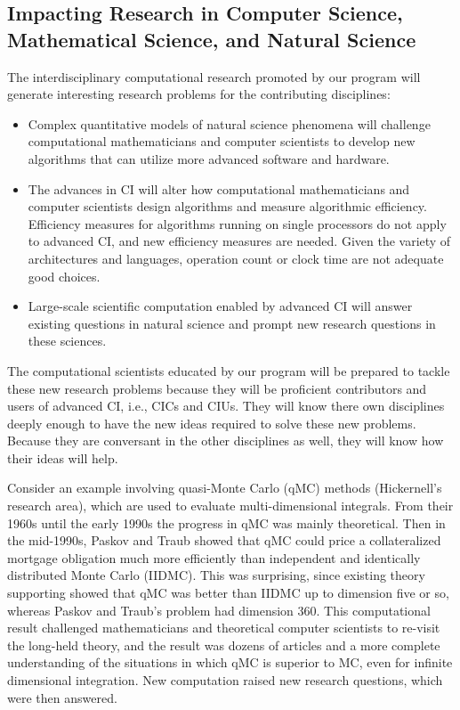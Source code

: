 \documentclass[11pt]{NSFamsart}
\begin{document}
\subsection{Impacting Research in Computer Science, Mathematical Science, and Natural Science}
The interdisciplinary computational research promoted by our program will generate interesting research problems for the contributing disciplines:
\begin{itemize}
\item Complex quantitative models of natural science phenomena will challenge computational mathematicians and computer scientists to develop new algorithms that can utilize more advanced software and hardware.  
\item The advances in CI will alter how computational mathematicians and computer scientists design algorithms and measure algorithmic efficiency.  Efficiency measures for algorithms running on single processors do not apply to advanced CI, and new efficiency measures are needed.  Given the variety of architectures and languages, operation count or  clock time are not adequate good choices.
\item Large-scale scientific computation enabled by advanced CI will answer existing questions in natural science and prompt new research questions in these sciences.  
\end{itemize}
The computational scientists educated by our program will be prepared to tackle these new research problems because they will be proficient contributors and users of advanced CI, i.e., CICs and CIUs.  They will know there own disciplines deeply enough to have the new ideas required to solve these new problems.  Because they are conversant in the other disciplines as well, they will know how their ideas will help.

Consider an example involving quasi-Monte Carlo (qMC) methods (Hickernell's research area), which are used to evaluate multi-dimensional integrals. From their 1960s until the early 1990s the progress in qMC was mainly theoretical.  Then in the mid-1990s, Paskov and Traub \cite{PasTra95} showed that qMC could price a collateralized mortgage obligation much more efficiently than independent and identically distributed Monte Carlo (IIDMC).  This was surprising, since existing theory supporting showed that qMC was better than IIDMC up to dimension five or so, whereas Paskov and Traub's problem had dimension 360.  This computational result challenged mathematicians and theoretical computer scientists to re-visit the long-held theory, and the result was dozens of articles and a more complete understanding of the situations in which qMC is superior to MC, even for infinite dimensional integration.  New computation raised new research questions, which  were then answered.
\end{document}
